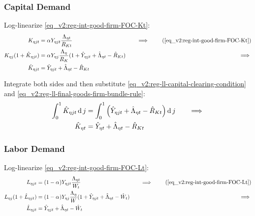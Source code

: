 \documentclass[../thesis.tex]{subfiles}
\begin{document}

\subsubsection*{Capital Demand}

Log-linearize \ref{eq_v2:reg-int-good-firm-FOC-Kt}:
\begin{alignat}{2}
	K_{\eta jt} &= {\alpha_{}} Y_{\eta jt} \frac{\Lambda_{\eta t}}{R_{Kt}} &\implies \tag{\ref{eq_v2:reg-int-good-firm-FOC-Kt}} \\
	K_{\eta j} (1+ \hat{K}_{\eta jt}) &= {\alpha_{}} Y_{\eta j} \frac{\Lambda_{\eta}}{R_{K}} (1+ \hat{Y}_{\eta jt} + \hat{\Lambda}_{\eta t} - \hat{R}_{K t}) \quad &\implies \nonumber \\
	\hat{K}_{\eta jt} &= \hat{Y}_{\eta jt} + \hat{\Lambda}_{\eta t} - \hat{R}_{K t} \nonumber
\end{alignat}

Integrate both sides and then substitute \ref{eq_v2:reg-ll-capital-clearing-condition} and \ref{eq_v2:reg-ll-final-goods-firm-bundle-rule}:
\begin{alignat}{2}
	\int_{0}^{1} \hat{K}_{\eta jt} \operatorname{d} j &= \int_{0}^{1} \left( \hat{Y}_{\eta jt} + \hat{\Lambda}_{\eta t} - \hat{R}_{K t} \right) \operatorname{d} j \quad &\implies \nonumber \\
	\hat{K}_{\eta t} &= \hat{Y}_{\eta t} + \hat{\Lambda}_{\eta t} - \hat{R}_{K t} \label{eq_v2:reg-ll-int-good-firm-FOC-Kt}
\end{alignat}


\subsubsection*{Labor Demand}

Log-linearize \ref{eq_v2:reg-int-good-firm-FOC-Lt}:
\begin{alignat}{2}
	L_{\eta jt} &= (1-{\alpha_{}}) Y_{\eta jt} \frac{\Lambda_{\eta t}}{W_{t}} &\implies \tag{\ref{eq_v2:reg-int-good-firm-FOC-Lt}} \\
	L_{\eta j} (1+ \hat{L}_{\eta jt}) &= (1-{\alpha_{}}) Y_{\eta j} \frac{\Lambda_{\eta}}{W} (1+ \hat{Y}_{\eta jt} +\hat{\Lambda}_{\eta t} -\hat{W}_{t}) \quad &\implies \nonumber \\
	\hat{L}_{\eta jt} &= \hat{Y}_{\eta jt} +\hat{\Lambda}_{\eta t} -\hat{W}_{t} \nonumber
\end{alignat}
\end{document}
